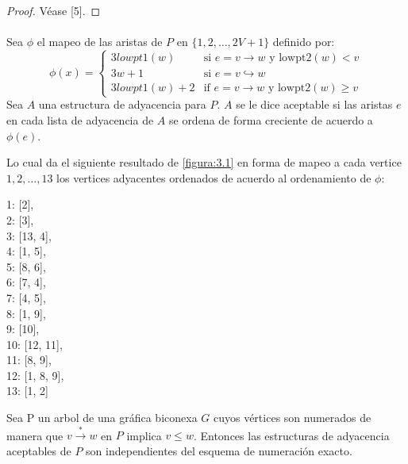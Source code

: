 \begin{proof}
Véase [5].
\end{proof}

\paragraph{}
Sea $\phi$ el mapeo de las aristas de $P$ en $\{1, 2, \ldots, 2V + 1\}$ definido por:
\begin{equation*}
\phi(x) =
\begin{cases}
3lowpt1(w) & \text{si $e = v \rightarrow w$ y lowpt$2(w) < v$}\\
3w + 1 & \text{si $e = v \hookrightarrow w$}\\
3lowpt1(w) + 2 & \text{if $e = v \rightarrow w$ y lowpt$2(w) \geq v$}
\end{cases}
\end{equation*}
Sea $A$ una estructura de adyacencia para $P$. $A$ se le dice aceptable si las aristas $e$ en cada lista de adyacencia de $A$ se ordena de forma creciente de acuerdo a $\phi(e)$.

Lo cual da el siguiente resultado de \ref{figura:3.1} en forma de mapeo a cada vertice $1, 2,\ldots, 13$ los vertices adyacentes ordenados de acuerdo al ordenamiento de $\phi$:
\begin{center}
1: [2],\\
 2: [3],\\
 3: [13, 4],\\
 4: [1, 5],\\
 5: [8, 6],\\
 6: [7, 4],\\
 7: [4, 5],\\
 8: [1, 9],\\
 9: [10],\\
 10: [12, 11],\\
 11: [8, 9],\\
 12: [1, 8, 9],\\
 13: [1, 2]
\end{center}
 
\begin{lemma}
Sea P un arbol de una gráfica biconexa $G$ cuyos vértices son numerados de manera que  $v \overset{\ast}{\rightarrow} w$ en $P$ implica $v \le w$. Entonces las estructuras de adyacencia aceptables de $P$ son independientes del esquema de numeración exacto.
\label{lema:3.8}
\end{lemma}

